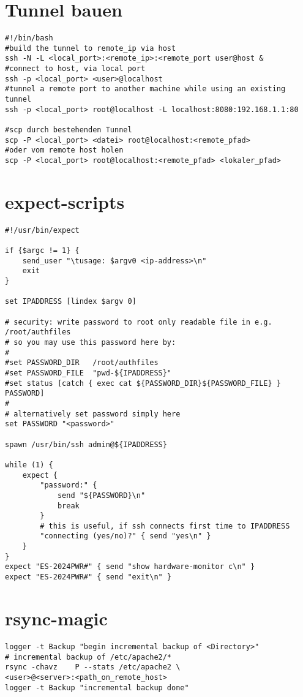 \documentclass[a4paper,10pt]{report}
\begin{document}
\section{Tunnel bauen}
\begin{verbatim}
#!/bin/bash
#build the tunnel to remote_ip via host
ssh -N -L <local_port>:<remote_ip>:<remote_port user@host &
#connect to host, via local port
ssh -p <local_port> <user>@localhost
#tunnel a remote port to another machine while using an existing tunnel
ssh -p <local_port> root@localhost -L localhost:8080:192.168.1.1:80

#scp durch bestehenden Tunnel
scp -P <local_port> <datei> root@localhost:<remote_pfad>
#oder vom remote host holen
scp -P <local_port> root@localhost:<remote_pfad> <lokaler_pfad>

\end{verbatim}

\section{expect-scripts}
\begin{verbatim}
#!/usr/bin/expect

if {$argc != 1} {
    send_user "\tusage: $argv0 <ip-address>\n"
    exit
}

set IPADDRESS [lindex $argv 0]

# security: write password to root only readable file in e.g. /root/authfiles
# so you may use this password here by:
#
#set PASSWORD_DIR   /root/authfiles
#set PASSWORD_FILE  "pwd-${IPADDRESS}"
#set status [catch { exec cat ${PASSWORD_DIR}${PASSWORD_FILE} } PASSWORD]
#
# alternatively set password simply here
set PASSWORD "<password>"

spawn /usr/bin/ssh admin@${IPADDRESS}

while (1) {
    expect {
        "password:" {			
            send "${PASSWORD}\n"
            break
        }
        # this is useful, if ssh connects first time to IPADDRESS
        "connecting (yes/no)?" { send "yes\n" }
    }
}
expect "ES-2024PWR#" { send "show hardware-monitor c\n" }
expect "ES-2024PWR#" { send "exit\n" }

\end{verbatim}

\section{rsync-magic}
\begin{verbatim}
logger -t Backup "begin incremental backup of <Directory>"
# incremental backup of /etc/apache2/*
rsync -chavz	P --stats /etc/apache2 \
<user>@<server>:<path_on_remote_host>
logger -t Backup "incremental backup done"
\end{verbatim}
\end{document}
